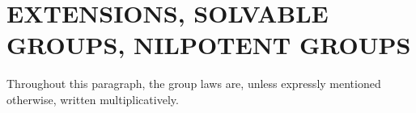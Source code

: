 \section{EXTENSIONS, SOLVABLE GROUPS, NILPOTENT GROUPS}

Throughout this paragraph, the group laws are, unless expressly mentioned otherwise, written multiplicatively.

